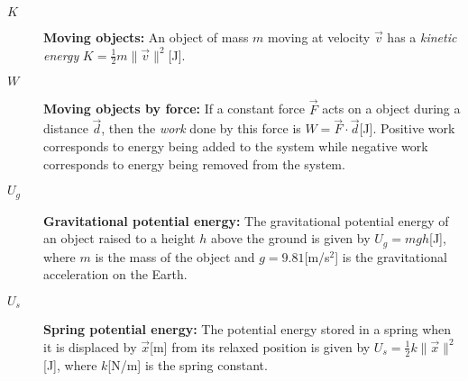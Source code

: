 \documentclass[letterpaper,9pt,journal]{IEEEtran}
\newcommand{\dokuitalic}[1]{\textsl{#1}}
\begin{document}
\begin{description}
\item[$K$] \textbf{Moving objects:} An object of mass $m$ moving at velocity $\vec{v}$
    has a \emph{kinetic energy} $K = \frac{1}{2}m\|\vec{v}\|^2$[J].
\item[$W$] \textbf{Moving objects by force:} 
If a constant force $\vec{F}$ acts on a object 
    during a distance $\vec{d}$, then the \emph{work} done by this
    force is $W=\vec{F}\cdot \vec{d}$[J].
    Positive work corresponds to energy being added to the system while
    negative work corresponds to energy being removed from the system.
\item[$U_g$] 
  \textbf{Gravitational potential energy:} 
  The gravitational potential energy
    of an object raised to a height $h$ above the ground is
    given by $U_g = mgh$[J], where $m$ is the mass of the object
    and $g=9.81$[m/s$^2$] is the gravitational acceleration on the Earth.
\item[$U_s$]
  \textbf{Spring potential energy:}
  The potential energy stored in a spring
    when it is displaced by $\vec{x}$[m] from its relaxed position 
    is given by $U_{s} = \frac{1}{2}k\|\vec{x}\|^2$[J],
    where $k$[N/m] is the spring constant.
\end{description}



%




%
\end{document}
